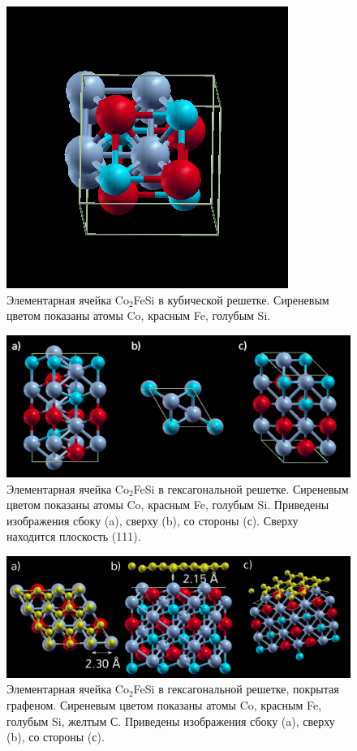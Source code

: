 \begin{figure}[h]
    \centering
    \includegraphics[scale=0.5]{images/co2fesi-cell-2.png}
    \caption{Элементарная ячейка Co$_2$FeSi в кубической решетке. Сиреневым цветом показаны атомы Co, красным Fe, голубым Si.}
    \label{fig:cubic-cell}
\end{figure}

\begin{figure}[h]
    \centering
    \includegraphics[scale=0.6]{images/hex-cell0.png}
    \caption{Элементарная ячейка Co$_2$FeSi в гексагональной решетке. Сиреневым цветом показаны атомы Co, красным Fe, голубым Si. Приведены изображения сбоку (a), сверху (b), со стороны (с). Сверху находится плоскость (111). }
    \label{fig:hex-cell}
\end{figure}

\begin{figure}[h]
    \centering
    \includegraphics[scale=0.6]{images/co2fesi-graphene-cell.png}
    \caption{Элементарная ячейка Co$_2$FeSi в гексагональной решетке, покрытая графеном. Сиреневым цветом показаны атомы Co, красным Fe, голубым Si, желтым С. Приведены изображения сбоку (a), сверху (b), со стороны (с). }
    \label{fig:graphene-cofe-cell}
\end{figure}

